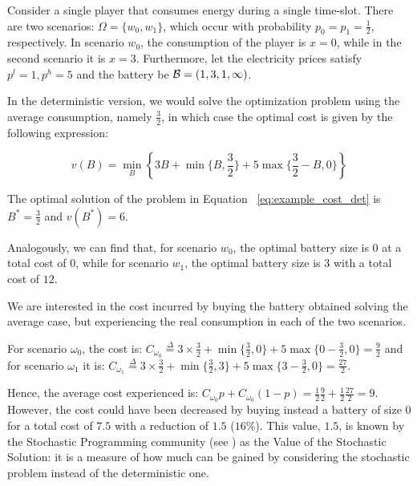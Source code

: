 \begin{example}\label{ex:stoc_example}

Consider a single player that consumes energy during a single time-slot. There are two scenarios: $\Omega = \{ w_0, w_1\}$, which occur with probability $p_0 = p_1 = \frac 1 2$, respectively.
In scenario $w_0$, the consumption of the player is $x = 0$, while in the second scenario it is $x = 3$. Furthermore, let the electricity prices satisfy $p^l = 1, p^h = 5$ and the battery be $\mathcal{B} = (1, 3, 1, \infty)$.

In the deterministic version, we would solve the optimization problem using the average consumption, namely $\frac 3 2$, in which case the optimal cost is given by the following expression:

\begin{equation}\label{eq:example_cost_det}
  v(B) = \min_B \left\{3B + \min\{ B, \frac 3 2\} + 5\max\{\frac 3 2 - B, 0\} \right\}
\end{equation}

The optimal solution of the problem in Equation ~\ref{eq:example_cost_det} is $B^*=\frac 3 2$  and $v(B^*) = 6$.

Analogously, we can find that, for scenario $w_0$, the optimal battery size is $0$ at a total cost of $0$, while for scenario $w_1$, the optimal battery size is $3$ with a total cost of $12$.

We are interested in the cost incurred by buying the battery obtained solving the average case, but experiencing the real consumption in each of the two scenarios.

For scenario $\omega_0$, the cost is: $C_{\omega_0} \overset{\Delta}{=} 3 \times \frac 3 2 + \min\{\frac 3 2, 0\} + 5\max\{0 - \frac 3 2, 0\} = \frac 9 2 $
and for scenario $\omega_1$ it is: $C_{\omega_1} \overset{\Delta}{=} 3 \times  \frac 3 2 + \min\{\frac 3 2, 3\} + 5\max\{3 - \frac3 2, 0\} = \frac{27}{2}$.

Hence, the average cost experienced is: $C_{\omega_0}p + C_{\omega_0}(1-p) = \frac{1}{2}\frac{9}{2} + \frac{1}{2}\frac{27}{2} = 9$. However, the cost could have been decreased by buying instead a battery of size $0$ for a total cost of $7.5$ with a reduction of $1.5$ ($16\%$). This value, $1.5$, is known by the Stochastic Programming community (see \cite{kall1994stochastic}) as the Value of the Stochastic Solution: it is a measure of how much can be gained by considering the stochastic problem instead of the deterministic one.




\end{example}
